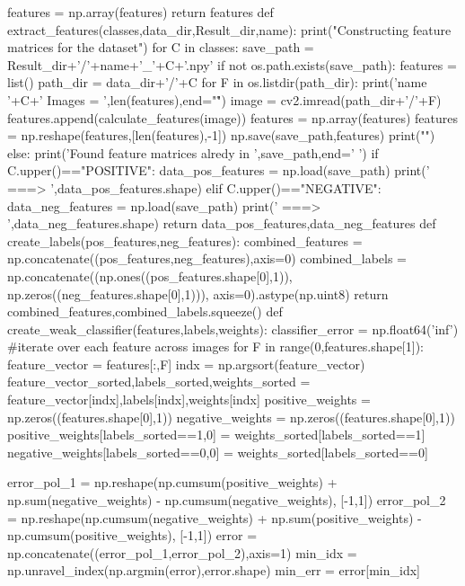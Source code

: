 \documentclass{article}
\begin{document}
\begin{python}
	features = np.array(features)
	return features
def extract_features(classes,data_dir,Result_dir,name):
	print("Constructing feature matrices for the dataset")
	for C in classes:
		save_path = Result_dir+'/'+name+'_'+C+'.npy'
		if not os.path.exists(save_path):
			features = list()
			path_dir = data_dir+'/'+C
			for F in os.listdir(path_dir):
				print('name '+C+' Images = ',len(features),end="\r")
				image = cv2.imread(path_dir+'/'+F)
				features.append(calculate_features(image))
			features = np.array(features)
			features = np.reshape(features,[len(features),-1])
			np.save(save_path,features)
			print("\n")
		else:
			print('Found feature matrices alredy in ',save_path,end=' ')
			if C.upper()=="POSITIVE":
				data_pos_features = np.load(save_path)
				print(' ===> ',data_pos_features.shape)
			elif C.upper()=="NEGATIVE":
				data_neg_features = np.load(save_path)
				print(' ===> ',data_neg_features.shape)
	return data_pos_features,data_neg_features
def create_labels(pos_features,neg_features):
	combined_features = np.concatenate((pos_features,neg_features),axis=0)
	combined_labels = np.concatenate((np.ones((pos_features.shape[0],1)), np.zeros((neg_features.shape[0],1))), axis=0).astype(np.uint8)
	return combined_features,combined_labels.squeeze()
def create_weak_classifier(features,labels,weights):
	classifier_error = np.float64('inf')
	#iterate over each feature across images
	for F in range(0,features.shape[1]):
		feature_vector = features[:,F]
		indx = np.argsort(feature_vector)
		feature_vector_sorted,labels_sorted,weights_sorted = feature_vector[indx],labels[indx],weights[indx]
		positive_weights = np.zeros((features.shape[0],1))
		negative_weights = np.zeros((features.shape[0],1))
		positive_weights[labels_sorted==1,0] = weights_sorted[labels_sorted==1]
		negative_weights[labels_sorted==0,0] = weights_sorted[labels_sorted==0]

		error_pol_1 = np.reshape(np.cumsum(positive_weights) + np.sum(negative_weights) - np.cumsum(negative_weights), [-1,1])
		error_pol_2 = np.reshape(np.cumsum(negative_weights) + np.sum(positive_weights) - np.cumsum(positive_weights), [-1,1])
		error = np.concatenate((error_pol_1,error_pol_2),axis=1)
		min_idx = np.unravel_index(np.argmin(error),error.shape)
		min_err = error[min_idx]


\end{python}
\end{document}
